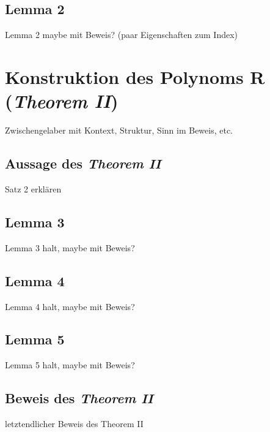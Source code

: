 \documentclass[11pt]{article}
\begin{document}
        \subsection{Lemma 2}
        \label{subsec:lemma2}
            Lemma 2 maybe mit Beweis? (paar Eigenschaften zum Index)

    \section{Konstruktion des Polynoms R (\emph{Theorem II})}
    \label{sec:th2}
        Zwischengelaber mit Kontext, Struktur, Sinn im Beweis, etc.

        \subsection{Aussage des \emph{Theorem II}}
        \label{subsec:th2}
            \textrm{Satz 2 erklären}

        \subsection{Lemma 3}
        \label{subsec:lemma3}
            Lemma 3 halt, maybe mit Beweis?

        \subsection{Lemma 4}
        \label{subsec:lemma4}
            Lemma 4 halt, maybe mit Beweis?

        \subsection{Lemma 5}
        \label{subsec:lemma5}
            Lemma 5 halt, maybe mit Beweis?

        \subsection{Beweis des \emph{Theorem II}}
        \label{subsec:proof-th-2}
            letztendlicher Beweis des Theorem II
        
\end{document}
